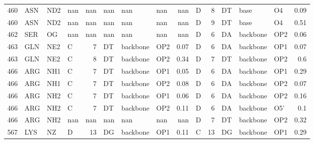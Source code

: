 \begin{longtable}{rlllrlllrlrlllr}
       460 & ASN        & ND2    & nan       &         nan & nan          & nan         & nan      &        nan    & D         &           8 & DT           & base        & O4       &          0.09 \\
       460 & ASN        & ND2    & nan       &         nan & nan          & nan         & nan      &        nan    & D         &           9 & DT           & base        & O4       &          0.51 \\
       462 & SER        & OG     & nan       &         nan & nan          & nan         & nan      &        nan    & D         &           6 & DA           & backbone    & OP2      &          0.06 \\
       463 & GLN        & NE2    & C         &           7 & DT           & backbone    & OP2      &          0.07 & D         &           6 & DA           & backbone    & OP1      &          0.07 \\
       463 & GLN        & NE2    & C         &           8 & DT           & backbone    & OP2      &          0.34 & D         &           7 & DT           & backbone    & OP2      &          0.6  \\
       466 & ARG        & NH1    & C         &           7 & DT           & backbone    & OP1      &          0.05 & D         &           6 & DA           & backbone    & OP1      &          0.29 \\
       466 & ARG        & NH1    & C         &           7 & DT           & backbone    & OP2      &          0.08 & D         &           6 & DA           & backbone    & OP2      &          0.07 \\
       466 & ARG        & NH2    & C         &           7 & DT           & backbone    & OP1      &          0.06 & D         &           6 & DA           & backbone    & OP2      &          0.16 \\
       466 & ARG        & NH2    & C         &           7 & DT           & backbone    & OP2      &          0.11 & D         &           6 & DA           & backbone    & O5'      &          0.1  \\
       466 & ARG        & NH2    & nan       &         nan & nan          & nan         & nan      &        nan    & D         &           7 & DT           & backbone    & OP2      &          0.32 \\
       567 & LYS        & NZ     & D         &          13 & DG           & backbone    & OP1      &          0.11 & C         &          13 & DG           & backbone    & OP1      &          0.29 \\

\end{longtable}

